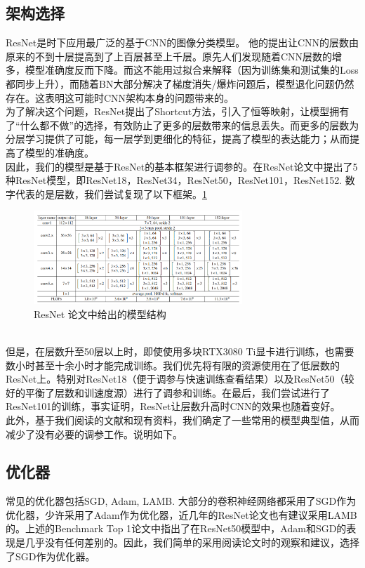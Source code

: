 \documentclass[UTF8,12pt]{article} %
\theoremstyle{definition}
\begin{document}
\subsection{架构选择}
ResNet是时下应用最广泛的基于CNN的图像分类模型。\cite{he2015deep} 他的提出让CNN的层数由原来的不到十层提高到了上百层甚至上千层。原先人们发现随着CNN层数的增多，模型准确度反而下降。而这不能用过拟合来解释（因为训练集和测试集的Loss都同步上升），而随着BN大部分解决了梯度消失/爆炸问题后，模型退化问题仍然存在。这表明这可能时CNN架构本身的问题带来的。
\\ 
\indent
为了解决这个问题，ResNet提出了Shortcut方法，引入了恒等映射，让模型拥有了“什么都不做”的选择，有效防止了更多的层数带来的信息丢失。而更多的层数为分层学习提供了可能，每一层学到更细化的特征，提高了模型的表达能力；从而提高了模型的准确度。
\\ 
\indent
因此，我们的模型是基于ResNet的基本框架进行调参的。在ResNet论文\cite{he2015deep}中提出了5种ResNet模型，即ResNet18，ResNet34，ResNet50，ResNet101，ResNet152. 数字代表的是层数，我们尝试复现了以下框架。\ref{Fig.resnet1}
\begin{figure}[h] %
	\centering %
	\includegraphics[width=0.7\textwidth]{resnet.png} %
	\caption{ResNet 论文中给出的模型结构} %
	\label{Fig.resnet1} %
\end{figure}
\\
\indent
但是，在层数升至50层以上时，即使使用多块RTX3080 Ti显卡进行训练，也需要数小时甚至十余小时才能完成训练。我们优先将有限的资源使用在了低层数的ResNet上。特别对ResNet18（便于调参与快速训练查看结果）以及ResNet50（较好的平衡了层数和训速度源）进行了调参和训练。在最后，我们尝试进行了ResNet101的训练，事实证明，ResNet让层数升高时CNN的效果也随着变好。
\\
\indent
此外，基于我们阅读的文献和现有资料，我们确定了一些常用的模型典型值，从而减少了没有必要的调参工作。说明如下。

\subsection{优化器}
常见的优化器包括SGD, Adam, LAMB. 大部分的卷积神经网络都采用了SGD作为优化器，少许采用了Adam作为优化器，近几年的ResNet论文也有建议采用LAMB的。上述的Benchmark Top 1\cite{dosovitskiy2021image}论文中指出了在ResNet50模型中，Adam和SGD的表现是几乎没有任何差别的。\cite{QuoraAnswer}因此，我们简单的采用阅读论文时的观察和建议，选择了SGD作为优化器。
\end{document}
